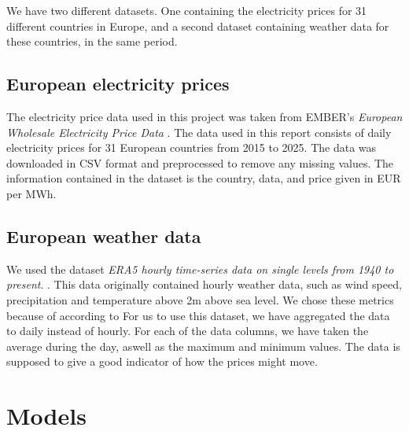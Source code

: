 \documentclass[12pt]{article}
\begin{document}
We have two different datasets. One containing the electricity prices for 31 different countries in Europe, and a second dataset containing weather data for these countries, in the same period. 

\subsection{European electricity prices}

The electricity price data used in this project was taken from EMBER's \textit{European Wholesale Electricity Price Data} \citep{ember2025}.  The data used in this report consists of daily electricity prices for 31 European countries from 2015 to 2025. The data was downloaded in CSV format and preprocessed to remove any missing values. The information contained in the dataset is the country, data, and price given in EUR per MWh. 

\subsection{European weather data}
We used the dataset \textit{ERA5 hourly time-series data on single levels from 1940 to present}. \citep{hersbach2025era5}. This data originally contained hourly weather data, such as wind speed, precipitation and temperature above 2m above sea level. We chose these metrics because of according to \cite{} For us to use this dataset, we have aggregated the data to daily instead of hourly. For each of the data columns, we have taken the average during the day, aswell as the maximum and minimum values. The data is supposed to give a good indicator of how the prices might move. 








\section{Models}
\end{document}
